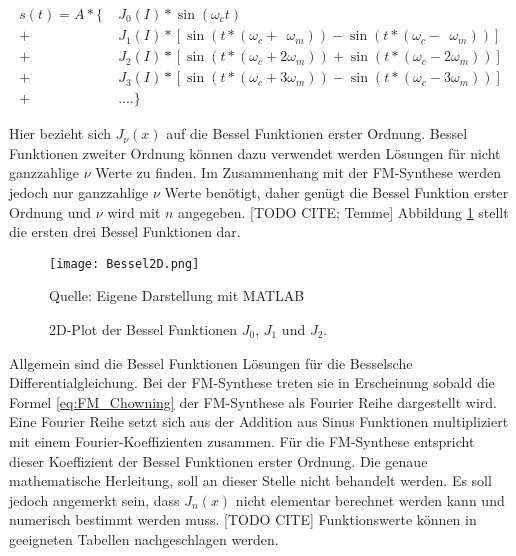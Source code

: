 
\begin{equation}
\begin{split}
s(t)=A*\{\; & J_0(I)*\sin(\omega_c t)  \\
         +&J_1(I)*[\sin(t*(\omega_c + \;\,\omega_m))-\sin(t*(\omega_c-\;\,\omega_m))] \\
         +&J_2(I)*[\sin(t*(\omega_c + 2\omega_m))+\sin(t*(\omega_c-2\omega_m))] \\
         +&J_3(I)*[\sin(t*(\omega_c + 3\omega_m))-\sin(t*(\omega_c-3\omega_m))] \\
         +&....\}
\end{split}
\label{eq:chowningAddition}
\end{equation}

Hier bezieht sich $J_\nu(x)$ auf die Bessel Funktionen erster Ordnung. Bessel Funktionen zweiter Ordnung können dazu verwendet werden Lösungen für nicht ganzzahlige $\nu$ Werte zu finden. Im Zusammenhang mit der FM-Synthese werden jedoch nur ganzzahlige $\nu$ Werte benötigt, daher genügt die Bessel Funktion erster Ordnung und $\nu$ wird mit $n$ angegeben. [TODO CITE; Temme] Abbildung \ref{fig:bessel2D} stellt die ersten drei Bessel Funktionen dar.

\begin{figure} [ht]
\centering
  \texttt{[image: Bessel2D.png]}
\caption{2D-Plot der Bessel Funktionen $J_0$, $J_1$ und $J_2$.}
\label{fig:bessel2D}
Quelle: Eigene Darstellung mit MATLAB
\end{figure}

\FloatBarrier


Allgemein sind die Bessel Funktionen Lösungen für die Besselsche Differentialgleichung. Bei der FM-Synthese treten sie in Erscheinung sobald die Formel \ref{eq:FM_Chowning} der FM-Synthese als Fourier Reihe dargestellt wird. Eine Fourier Reihe setzt sich aus der Addition aus Sinus Funktionen multipliziert mit einem Fourier-Koeffizienten zusammen. Für die FM-Synthese entspricht dieser Koeffizient der Bessel Funktionen erster Ordnung. \cite[S. 221]{lathi} Die genaue mathematische Herleitung, soll an dieser Stelle nicht behandelt werden. Es soll jedoch angemerkt sein, dass $J_n(x)$ nicht elementar berechnet werden kann und numerisch bestimmt werden muss. [TODO CITE] \cite[S. 385]{abramowitz} Funktionswerte können in geeigneten Tabellen nachgeschlagen werden. \cite{davis}

